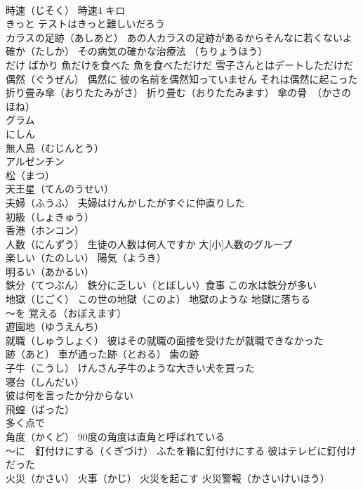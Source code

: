 \documentclass[8pt]{extreport}
\begin{document}
\begin{CJK}{UTF8}{min}
\\	時速（じそく） 時速4 キロ
\\	きっと テストはきっと難しいだろう
\\	カラスの足跡（あしあと） あの人カラスの足跡があるからそんなに若くないよ
\\	確か（たしか） その病気の確かな治療法 （ちりょうほう）
\\	だけ ばかり 魚だけを食べた 魚を食べただけだ 雪子さんとはデートしただけだ
\\	偶然（ぐうぜん） 偶然に 彼の名前を偶然知っていません それは偶然に起こった
\\	折り畳み傘（おりたたみがさ） 折り畳む（おりたたみます） 傘の骨　（かさのほね）
\\	グラム
\\	にしん
\\	無人島（むじんとう）
\\	アルゼンチン
\\	松（まつ）
\\	天王星（てんのうせい）
\\	夫婦（ふうふ） 夫婦はけんかしたがすぐに仲直りした
\\	初級（しょきゅう）
\\	香港（ホンコン）
\\	人数（にんずう） 生徒の人数は何人ですか 大[小]人数のグループ
\\	楽しい（たのしい） 陽気（ようき）
\\	明るい（あかるい）
\\	鉄分（てつぶん） 鉄分に乏しい（とぼしい）食事 この水は鉄分が多い
\\	地獄（じごく） この世の地獄（このよ） 地獄のような 地獄に落ちる
\\	～を 覚える（おぼえます）
\\	遊園地（ゆうえんち）
\\	就職（しゅうしょく） 彼はその就職の面接を受けたが就職できなかった
\\	跡（あと） 車が通った跡（とおる） 歯の跡
\\	子牛（こうし） けんさん子牛のような大きい犬を買った
\\	寝台（しんだい）
\\	彼は何を言ったか分からない
\\	飛蝗（ばった）
\\	多く点で
\\	角度（かくど） 90度の角度は直角と呼ばれている
\\	～に　釘付けにする（くぎづけ） ふたを箱に釘付けにする 彼はテレビに釘付けだった
\\	火災（かさい） 火事（かじ） 火災を起こす 火災警報（かさいけいほう）

\end{CJK}
\end{document}
